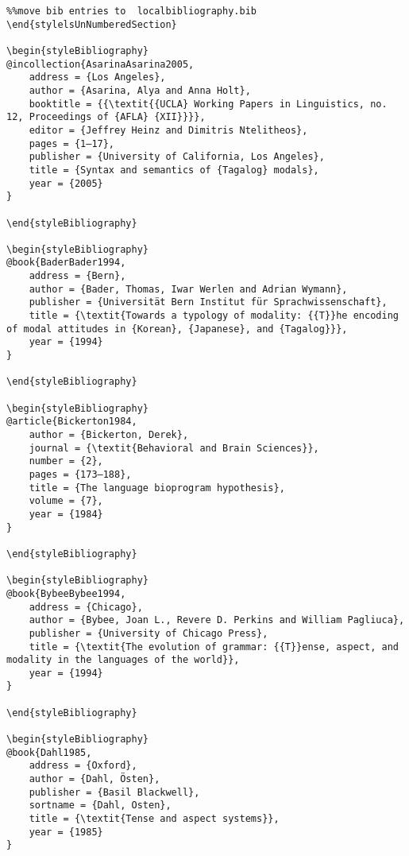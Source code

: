 \documentclass[output=paper]{langsci/langscibook}
\begin{document}
\begin{stylelsUnNumberedSection}
\begin{verbatim}%%move bib entries to  localbibliography.bib
\end{stylelsUnNumberedSection}

\begin{styleBibliography}
@incollection{AsarinaAsarina2005,
	address = {Los Angeles},
	author = {Asarina, Alya and Anna Holt},
	booktitle = {{\textit{{UCLA} Working Papers in Linguistics, no. 12, Proceedings of {AFLA} {XII}}}},
	editor = {Jeffrey Heinz and Dimitris Ntelitheos},
	pages = {1–17},
	publisher = {University of California, Los Angeles},
	title = {Syntax and semantics of {Tagalog} modals},
	year = {2005}
}

\end{styleBibliography}

\begin{styleBibliography}
@book{BaderBader1994,
	address = {Bern},
	author = {Bader, Thomas, Iwar Werlen and Adrian Wymann},
	publisher = {Universität Bern Institut für Sprachwissenschaft},
	title = {\textit{Towards a typology of modality: {{T}}he encoding of modal attitudes in {Korean}, {Japanese}, and {Tagalog}}},
	year = {1994}
}

\end{styleBibliography}

\begin{styleBibliography}
@article{Bickerton1984,
	author = {Bickerton, Derek},
	journal = {\textit{Behavioral and Brain Sciences}},
	number = {2},
	pages = {173–188},
	title = {The language bioprogram hypothesis},
	volume = {7},
	year = {1984}
}

\end{styleBibliography}

\begin{styleBibliography}
@book{BybeeBybee1994,
	address = {Chicago},
	author = {Bybee, Joan L., Revere D. Perkins and William Pagliuca},
	publisher = {University of Chicago Press},
	title = {\textit{The evolution of grammar: {{T}}ense, aspect, and modality in the languages of the world}},
	year = {1994}
}

\end{styleBibliography}

\begin{styleBibliography}
@book{Dahl1985,
	address = {Oxford},
	author = {Dahl, Östen},
	publisher = {Basil Blackwell},
	sortname = {Dahl, Osten},
	title = {\textit{Tense and aspect systems}},
	year = {1985}
}


\end{verbatim}
\end{stylelsUnNumberedSection}
\end{document}
